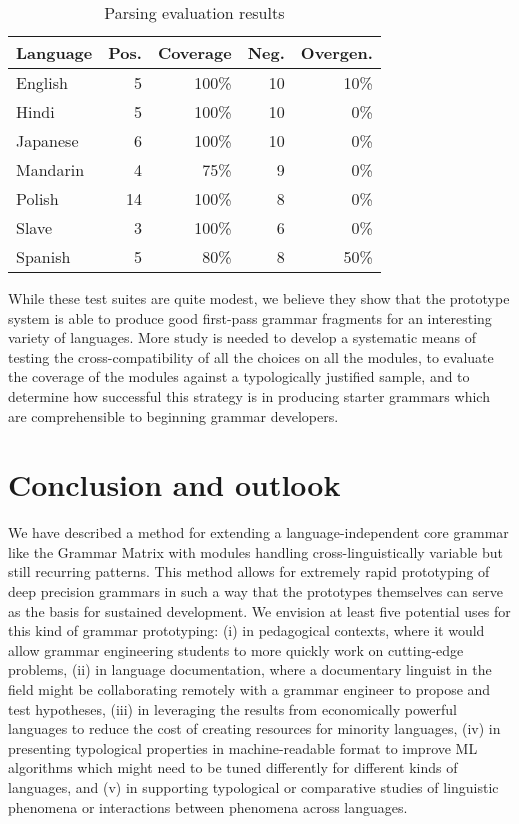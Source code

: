 \documentclass[11pt]{article}
\begin{document}
\begin{table}[ht]
\begin{center}
\small
\begin{tabular}{lrrrr}
\hline
Language & Pos. & Coverage & Neg. & Overgen. \\ \hline
English  & 5	     & 100\%	& 10 & 10\%\\
Hindi    & 5         & 100\% 	& 10 & 0\% \\
Japanese & 6         & 100\%    & 10 & 0\% \\
Mandarin & 4	     &  75\%	&  9 & 0\% \\
Polish   & 14	     & 100\%    &  8 & 0\% \\
Slave    & 3         & 100\%	&  6 & 0\% \\
Spanish  & 5         & 80\%	& 8  & 50\% \\ \hline
\end{tabular}
\end{center}
\caption{Parsing evaluation results}
\label{testresults}
\end{table}

While these test suites are quite modest, we believe they show that
the prototype system is able to produce good first-pass grammar
fragments for an interesting variety of languages.  More study is
needed to develop a systematic means of testing the
cross-compatibility of all the choices on all the modules, to evaluate
the coverage of the modules against a typologically justified sample,
and to determine how successful this strategy is in producing starter
grammars which are comprehensible to beginning grammar developers.

\section{Conclusion and outlook}

We have described a method for extending a language-independent core
grammar like the Grammar Matrix with modules handling
cross-linguistically variable but still recurring patterns.  This
method allows for extremely rapid prototyping of deep precision
grammars in such a way that the prototypes themselves can serve as the
basis for sustained development.  We envision at least five potential
uses for this kind of grammar prototyping: (i) in pedagogical
contexts, where it would allow grammar engineering students to more
quickly work on cutting-edge problems, (ii) in language documentation,
where a documentary linguist in the field might be collaborating
remotely with a grammar engineer to propose and test hypotheses, (iii)
in leveraging the results from economically powerful languages to
reduce the cost of creating resources for minority languages, (iv) in
presenting typological properties in machine-readable format to
improve ML algorithms which might need to be tuned differently for
different kinds of languages, and (v) in supporting typological or
comparative studies of linguistic phenomena or interactions between
phenomena across languages.
\end{document}
